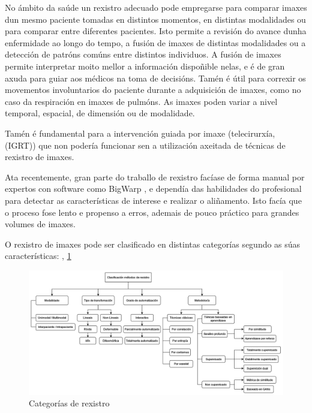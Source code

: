 No ámbito da saúde un rexistro adecuado pode empregarse para comparar imaxes dun mesmo paciente tomadas en distintos momentos, en distintas modalidades ou para comparar entre diferentes pacientes.
Isto permite a revisión do avance dunha enfermidade ao longo do tempo, a fusión de imaxes de distintas modalidades ou a detección de patróns comúns entre distintos individuos.
A fusión de imaxes permite interpretar moito mellor a información dispoñible nelas, e é de gran axuda para guiar aos médicos na toma de decisións.
Tamén é útil para correxir os movementos involuntarios do paciente durante a adquisición de imaxes, como no caso da respiración en imaxes de pulmóns.
As imaxes poden variar a nivel temporal, espacial, de dimensión ou de modalidade.

Tamén é fundamental para a intervención guiada por imaxe (telecirurxía, (\gls{IGRT})) que non 
podería funcionar sen a utilización axeitada de técnicas de rexistro de imaxes. \cite{wang2022neuralrenderingstereo3d}

Ata recentemente, gran parte do traballo de rexistro facíase de forma manual por expertos con software como BigWarp \cite{bigwarp}, 
e dependía das habilidades do profesional para detectar as características de interese e realizar o aliñamento.
Isto facía que o proceso fose lento e propenso a erros, ademais de pouco práctico para grandes volumes de imaxes.

O rexistro de imaxes pode ser clasificado en distintas categorías segundo as súas características:
\cite{deeplernreview3dreg}, \cite{bharati2022deeplearningmedicalimage}
\ref{fig:categorias_de_rexistro}


\begin{figure}[hp!]
    \centering
    \includegraphics[width=1\textwidth]{imaxes/catreg.drawio.png}
    \caption{Categorías de rexistro}
    \label{fig:categorias_de_rexistro}
\end{figure}

